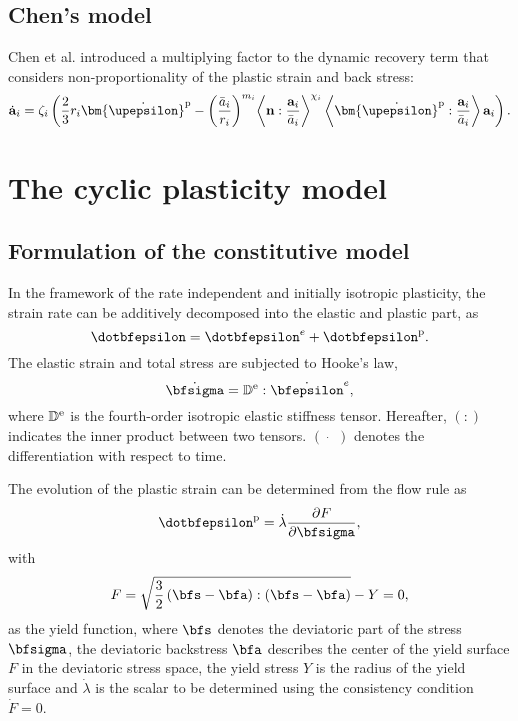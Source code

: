 \subsection{Chen's model}
\noindent
Chen et al. \cite{chen2004modified} introduced a multiplying factor to the dynamic recovery term that considers non-proportionality of the plastic strain and back stress:
\begin{equation}
{{\dot{\bf a}}_i} = {\zeta _i}\left( {\frac{2}{3}{r_i}{{{\bm{\dot \upepsilon }}}^{\rm{p}}} - {{\left( {\frac{{{{\bar a}_i}}}{{{r_i}}}} \right)}^{{m_i}}}{{\left\langle {{\bf{n}}:\frac{{{{\bf{a}}_i}}}{{{{\bar a}_i}}}} \right\rangle }^{{\chi _i}}}\left\langle {{{{\bm{\dot \upepsilon }}}^{\rm{p}}}:\frac{{{{\bf{a}}_i}}}{{{{\bar a}_i}}}} \right\rangle {{\bf{a}}_i}} \right).
\end{equation}

\section{The cyclic plasticity model}

\subsection{Formulation of the constitutive model}
\noindent
In the framework of the rate independent and initially isotropic plasticity, the strain rate can be additively decomposed into the elastic and plastic  part, as
\begin{equation}
\dotbfepsilon = {\dotbfepsilon}^e + {\dotbfepsilon}^{\rm{p}}.
\end{equation}
The elastic strain and total stress are subjected to Hooke's law,
\begin{equation}
{\dot\bfsigma} = {\mathbb{D}^{\rm{e}}}:{\dot\bfepsilon^e},
\label{Equ:HookesLaw}
\end{equation}
where ${\mathbb{D}^{\rm{e}}}$ is the fourth-order isotropic elastic stiffness tensor. Hereafter, $(:)$ indicates the inner product between two tensors. $(\dot{\quad})$ denotes the differentiation with respect to time.

The evolution of the plastic strain can be determined from the flow rule as
\begin{equation}
{\dotbfepsilon}^{\rm{p}} = \dot \lambda \frac{{\partial F}}{{\partial {\bfsigma}}},
\end{equation}
with
\begin{equation}
F = \sqrt {\frac{3}{2}\left( {\bfs - \bfa} \right):\left( {\bfs - \bfa} \right)}  - Y=0,
\end{equation}
as the yield function, where $\bfs$ denotes the deviatoric part of the stress ${\bfsigma}$, the deviatoric backstress $\bfa$ describes the center of the yield surface $F$ in the deviatoric stress space, the yield stress $Y$ is the radius of the yield surface and $\dot \lambda$ is the scalar to be determined using the consistency condition $\dot F = 0$.


